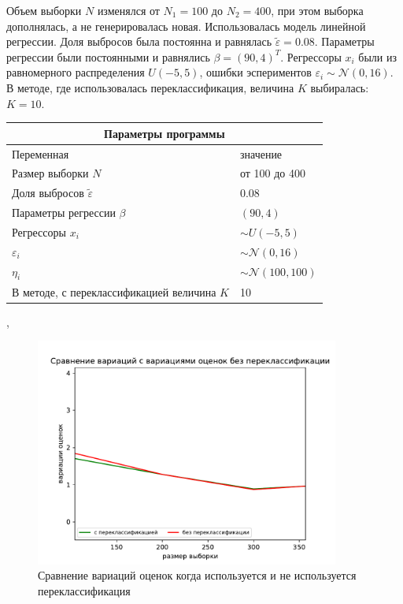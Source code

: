 Объем выборки $N$ изменялся от $N_1=100$ до $N_2=400$, при этом выборка дополнялась, а не генерировалась новая. Использовалась модель линейной регрессии. Доля выбросов была постоянна и равнялась $\widetilde{\varepsilon}=0.08$. Параметры регрессии были постоянными и равнялись $\beta=(90,4)^T$. 
Регрессоры $x_i$ были из равномерного распределения $U(-5,5)$, ошибки эспериментов $\varepsilon_i\sim \mathcal{N}(0,16)$. В методе, где использовалась переклассификация, величина $K$ выбиралась: $K=10$.
\vspace{3cm}
\begin{center}
    \label{tab1}
    \begin{tabular}{|p{5cm}|p{5cm}|}
        \hline
        \multicolumn{2}{|c|}{Параметры программы} \\
        \hline
        Переменная&значение\\
        \hline
        Размер выборки $N$& от 100 до 400\\
        \hline
        Доля выбросов $\widetilde{\varepsilon}$& 0.08\\
        \hline
        Параметры регрессии $\beta$& $(90,4)$\\
        \hline
        Регрессоры $x_i$ & $\sim U(-5,5)$\\
        \hline
        $\varepsilon_i$&$\sim \mathcal{N}(0,16)$\\
        \hline
        $\eta_i$&$\sim \mathcal{N}(100,100)$\\
        \hline
        В методе, с переклассификацией величина $K$& 10\\
        \hline
    \end{tabular},
\end{center}
\newpage
\begin{figure}[ht!]
    \centering
    \includegraphics[width=100mm]{../images/on_off_recl.pdf}
    \caption{Сравнение вариаций оценок когда используется и не используется переклассификация\label{overflow}}
    \label{pic2}
\end{figure}

\newpage
